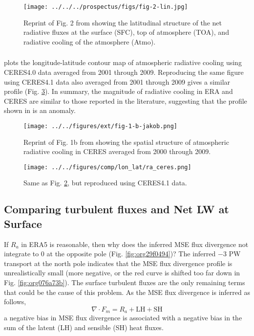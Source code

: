 \documentclass[11pt]{article}
\begin{document}
\begin{figure}[htbp]
\centering
\texttt{[image: ../../../prospectus/figs/fig-2-lin.jpg]}
\caption{\label{fig:org213f7f6}Reprint of Fig. 2 from \cite{lin_assessment_2008} showing the latitudinal structure of the net radiative fluxes at the surface (SFC), top of atmosphere (TOA), and radiative cooling of the atmosphere (Atmo).}
\end{figure}

\subsubsection{\cite{jakob_radiative_2019}}
\label{sec:orgc56ad75}
\cite{jakob_radiative_2019} plots the longitude-latitude contour map of atmospheric radiative cooling using CERES4.0 data averaged from 2001 through 2009. Reproducing the same figure using CERES4.1 data also averaged from 2001 through 2009 gives a similar profile (Fig. \ref{fig:orgf87d332}). In summary, the magnitude of radiative cooling in ERA and CERES are similar to those reported in the literature, suggesting that the profile shown in \cite{hartmann_global_2016} is an anomaly.

\begin{figure}[htbp]
\centering
\texttt{[image: ../../figures/ext/fig-1-b-jakob.png]}
\caption{\label{fig:org84940c7}Reprint of Fig. 1b from \cite{jakob_radiative_2019} showing the spatial structure of atmospheric radiative cooling in CERES averaged from 2000 through 2009.}
\end{figure}

\begin{figure}[htbp]
\centering
\texttt{[image: ../../figures/comp/lon\_lat/ra\_ceres.png]}
\caption{\label{fig:orgf87d332}Same as Fig. \ref{fig:org84940c7}, but reproduced using CERES4.1 data.}
\end{figure}

\subsection{Comparing turbulent fluxes and Net LW at Surface}
\label{sec:org3161d01}
If \(R_a\) in ERA5 is reasonable, then why does the inferred MSE flux divergence not integrate to 0 at the opposite pole (Fig. \ref{fig:org29f0494})? The inferred \(-3\) PW transport at the north pole indicates that the MSE flux divergence profile is unrealistically small (more negative, or the red curve is shifted too far down in Fig. \ref{fig:org076a73b}). The surface turbulent fluxes are the only remaining terms that could be the cause of this problem. As the MSE flux divergence is inferred as follows,
\begin{equation}
\nabla \cdot F_m = R_a + \mathrm{LH} + \mathrm{SH}
\end{equation}
a negative bias in MSE flux divergence is associated with a negative bias in the sum of the latent (LH) and sensible (SH) heat fluxes.
\end{document}
